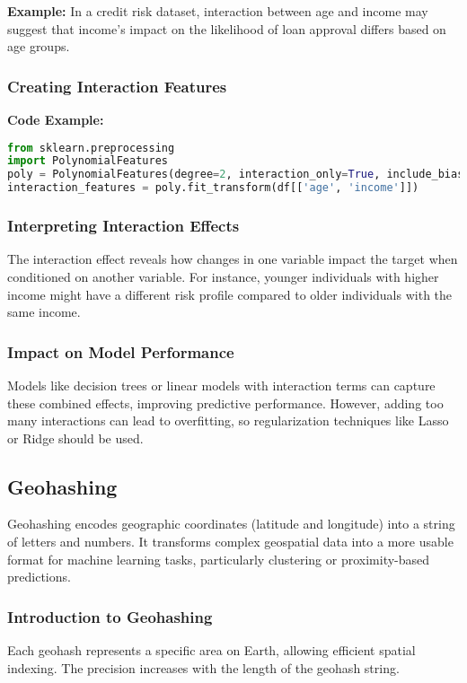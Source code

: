 \documentclass{article}
\begin{document}
\textbf{Example:} In a credit risk dataset, interaction between age and income may suggest that income's impact on the likelihood of loan approval differs based on age groups.

\subsubsection{Creating Interaction Features}

\textbf{Code Example:}

\begin{lstlisting}[language=Python]
from sklearn.preprocessing 
import PolynomialFeatures
poly = PolynomialFeatures(degree=2, interaction_only=True, include_bias=False)
interaction_features = poly.fit_transform(df[['age', 'income']])
\end{lstlisting}

\subsubsection{Interpreting Interaction Effects}
The interaction effect reveals how changes in one variable impact the target when conditioned on another variable. For instance, younger individuals with higher income might have a different risk profile compared to older individuals with the same income.

\subsubsection{Impact on Model Performance}
Models like decision trees or linear models with interaction terms can capture these combined effects, improving predictive performance. However, adding too many interactions can lead to overfitting, so regularization techniques like Lasso or Ridge should be used.

\subsection{Geohashing}
Geohashing encodes geographic coordinates (latitude and longitude) into a string of letters and numbers. It transforms complex geospatial data into a more usable format for machine learning tasks, particularly clustering or proximity-based predictions.

\subsubsection{Introduction to Geohashing}
Each geohash represents a specific area on Earth, allowing efficient spatial indexing. The precision increases with the length of the geohash string.
\end{document}
